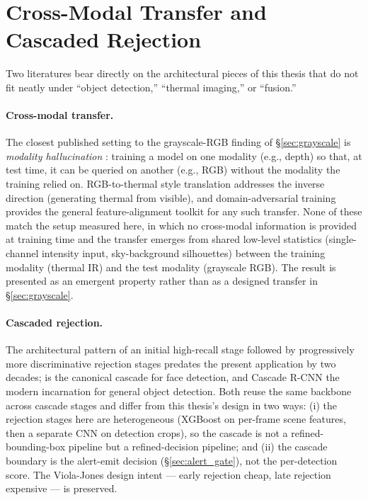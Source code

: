 \documentclass[12pt,a4paper,oneside,openright]{book}
\begin{document}
\section{Cross-Modal Transfer and Cascaded Rejection}
\label{sec:lit_xmodal_cascade}

Two literatures bear directly on the architectural pieces of this thesis that do not fit neatly under ``object detection,'' ``thermal imaging,'' or ``fusion.''

\paragraph{Cross-modal transfer.}
The closest published setting to the grayscale-RGB finding of \S\ref{sec:grayscale} is \emph{modality hallucination} \cite{hoffman2016modalityhallucination}: training a model on one modality (e.g., depth) so that, at test time, it can be queried on another (e.g., RGB) without the modality the training relied on. RGB-to-thermal style translation \cite{berg2018rgb2thermal,kniaz2018thermalgan} addresses the inverse direction (generating thermal from visible), and domain-adversarial training \cite{ganin2016domain} provides the general feature-alignment toolkit for any such transfer. None of these match the setup measured here, in which no cross-modal information is provided at training time and the transfer emerges from shared low-level statistics (single-channel intensity input, sky-background silhouettes) between the training modality (thermal IR) and the test modality (grayscale RGB). The result is presented as an emergent property rather than as a designed transfer in \S\ref{sec:grayscale}.

\paragraph{Cascaded rejection.}
The architectural pattern of an initial high-recall stage followed by progressively more discriminative rejection stages predates the present application by two decades; \citet{viola2001rapid} is the canonical cascade for face detection, and Cascade R-CNN \cite{cai2018cascade} the modern incarnation for general object detection. Both reuse the same backbone across cascade stages and differ from this thesis's design in two ways: (i) the rejection stages here are heterogeneous (XGBoost on per-frame scene features, then a separate CNN on detection crops), so the cascade is not a refined-bounding-box pipeline but a refined-decision pipeline; and (ii) the cascade boundary is the alert-emit decision (\S\ref{sec:alert_gate}), not the per-detection score. The Viola-Jones design intent --- early rejection cheap, late rejection expensive --- is preserved.
\end{document}
